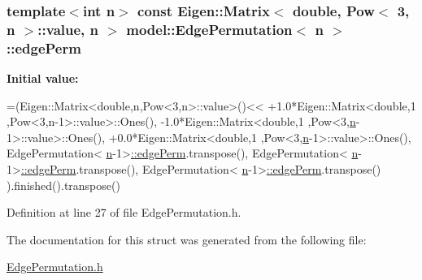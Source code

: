 \subsubsection[{edge\+Perm}]{\setlength{\rightskip}{0pt plus 5cm}template$<$int n$>$ const Eigen\+::\+Matrix$<$ double, {\bf Pow}$<$ 3, {\bf n} $>$\+::value, {\bf n} $>$ {\bf model\+::\+Edge\+Permutation}$<$ {\bf n} $>$\+::edge\+Perm\hspace{0.3cm}{\ttfamily [static]}}\label{structmodel_1_1_edge_permutation_a550b75fe12078acbc2f40a7133397022}
{\bfseries Initial value\+:}
\begin{DoxyCode}
=(Eigen::Matrix<double,n,Pow<3,n>::value>()<<
                                                                                +1.0*Eigen::Matrix<\textcolor{keywordtype}{double},1
      ,Pow<3,n-1>::value>::Ones(),
                                                                                -1.0*Eigen::Matrix<double,1
      ,Pow<3,\hyperlink{run_multipole_8m_a4c2d80ab32fc3a598413ae25e9f2bdce}{n}-1>::value>::Ones(),
                                                                                +0.0*Eigen::Matrix<double,1
      ,Pow<3,\hyperlink{run_multipole_8m_a4c2d80ab32fc3a598413ae25e9f2bdce}{n}-1>::value>::Ones(),
                                                                                  EdgePermutation<
      \hyperlink{run_multipole_8m_a4c2d80ab32fc3a598413ae25e9f2bdce}{n}-1>\hyperlink{structmodel_1_1_edge_permutation_a550b75fe12078acbc2f40a7133397022}{::edgePerm}.transpose(),
                                                                                  EdgePermutation<
      \hyperlink{run_multipole_8m_a4c2d80ab32fc3a598413ae25e9f2bdce}{n}-1>\hyperlink{structmodel_1_1_edge_permutation_a550b75fe12078acbc2f40a7133397022}{::edgePerm}.transpose(),
                                                                                EdgePermutation<
      \hyperlink{run_multipole_8m_a4c2d80ab32fc3a598413ae25e9f2bdce}{n}-1>\hyperlink{structmodel_1_1_edge_permutation_a550b75fe12078acbc2f40a7133397022}{::edgePerm}.transpose()
                                                                                ).finished().transpose()
\end{DoxyCode}


Definition at line 27 of file Edge\+Permutation.\+h.



The documentation for this struct was generated from the following file\+:\begin{DoxyCompactItemize}
\item 
\hyperlink{_edge_permutation_8h}{Edge\+Permutation.\+h}\end{DoxyCompactItemize}
